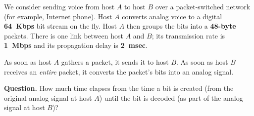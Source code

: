 We consider sending voice from host \(A\) to host \(B\) over a
packet\hyp{}switched network (for example, Internet phone). Host \(A\)
converts analog voice to a digital \textbf{64~Kbps} bit stream on the
fly. Host \(A\) then groups the bits into a \textbf{48\hyp{}byte}
packets. There is one link between host \(A\) and \(B\); its
transmission rate is \textbf{1~Mbps} and its propagation delay is
\textbf{2~msec}.

As soon as host \(A\) gathers a packet, it sends it to host \(B\). As
soon as host \(B\) receives an \emph{entire} packet, it converts the
packet's bits into an analog signal.

\textbf{Question.} How much time elapses from the time a bit is
created (from the original analog signal at host \(A\)) until the bit
is decoded (as part of the analog signal at host \(B\))?

